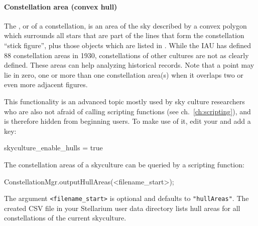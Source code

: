 \paragraph{Constellation area (convex hull)}
The , or  of a constellation, 
is an area of the sky described by a convex polygon which surrounds all stars that are part of the lines that form the constellation ``stick figure'', 
plus those objects which are listed in . 
While the IAU has defined 88 constellation areas in 1930, constellations of other cultures are not as clearly defined. These areas can help analyzing historical records.
Note that a point may lie in zero, one or more than one constellation area(s) when it overlaps two or even more adjacent figures. 

This functionality is an advanced topic mostly used by sky culture researchers \citep[e.g.][94-98]{Hoffmann2017a} who are also not afraid of calling scripting functions (see ch.~\ref{ch:scripting}), 
and is therefore hidden from beginning users. To make use of it, edit your  and add a key:
\begin{configfile}
[gui]
skyculture_enable_hulls = true 
\end{configfile}


The constellation areas of a skyculture can be queried by a scripting function:
\begin{script}
ConstellationMgr.outputHullAreas(<filename_start>);
\end{script}
The argument \texttt{<filename\_start>} is optional and defaults to \texttt{"hullAreas"}. 
The created CSV file  in your Stellarium user data directory lists hull areas for all constellations of the current skyculture. 


